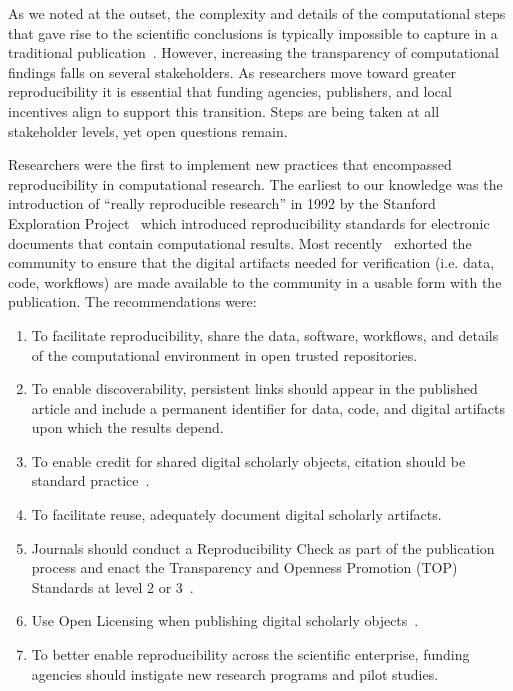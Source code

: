\documentclass[review]{elsarticle}
\begin{document}
As we noted at the outset, the complexity and details of the computational steps that gave rise to the scientific conclusions is typically impossible to capture in a traditional publication~\cite{victoria01}. However, increasing the transparency of computational findings falls on several stakeholders. As researchers move toward greater reproducibility it is essential that funding agencies, publishers, and local incentives align to support this transition. Steps are being taken at all stakeholder levels, yet open questions remain. 

Researchers were the first to implement new practices that encompassed reproducibility in computational research. The earliest to our knowledge was the introduction of ``really reproducible research'' in 1992 by the Stanford Exploration Project~\cite{victoria02} which introduced reproducibility standards for electronic documents that contain computational results. Most recently~\cite{victoria03} exhorted the community to ensure that the digital artifacts needed for verification (i.e. data, code, workflows) are made available to the community in a usable form with the publication. The recommendations were:

\begin{enumerate}
	\item To facilitate reproducibility, share the data, software, workflows, and details of the computational environment in open trusted repositories.
    \item To enable discoverability, persistent links should appear in the published article and include a permanent identifier for data, code, and digital artifacts upon which the results depend.
    \item To enable credit for shared digital scholarly objects, citation should be standard practice~\cite{victoria04,victoria05}.
    \item To facilitate reuse, adequately document digital scholarly artifacts.
    \item Journals should conduct a Reproducibility Check as part of the publication process and enact the Transparency and Openness Promotion (TOP) Standards at level 2 or 3~\cite{victoria06}.
    \item Use Open Licensing when publishing digital scholarly objects~\cite{victoria07,victoria08}.
    \item To better enable reproducibility across the scientific enterprise, funding agencies should instigate new research programs and pilot studies.
\end{enumerate}
\end{document}
